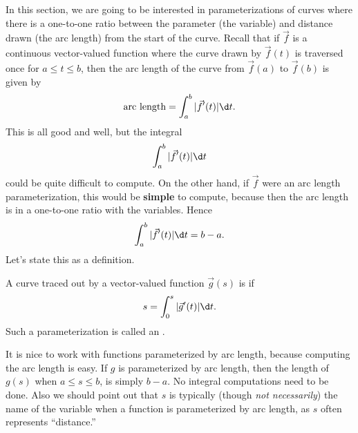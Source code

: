 \documentclass{ximera}
\begin{document}
In this section, we are going to be interested in parameterizations of
curves where there is a one-to-one ratio between the parameter (the
variable) and distance drawn (the arc length) from the start of the
curve.  Recall that if $\vec{f}$ is a continuous vector-valued
function where the curve drawn by $\vec{f}(t)$ is traversed once for
$a\le t\le b$, then the arc length of the curve from $\vec{f}(a)$ to
$\vec{f}(b)$ is given by
\[
\text{arc length} = \int_a^b |\vec{f}'(t)|\d t.
\]
This is all good and well, but the integral
\[
\int_a^b |\vec{f}'(t)|\d t
\]
could be quite difficult to compute. On the other hand, if $\vec{f}$
were an arc length parameterization, this would be \textbf{simple} to
compute, because then the arc length is in a one-to-one ratio with the
variables. Hence
\[
\int_a^b |\vec{f}'(t)|\d t = b-a.
\]
Let's state this as a definition.

\begin{definition}
  A curve traced out by a vector-valued function $\vec{g}(s)$ is  if
  \[
  s = \int_0^s |\vec{g}'(t)|\d t.
  \]
  Such a parameterization is called an .
\end{definition}
It is nice to work with functions parameterized by arc length, because
computing the arc length is easy. If $g$ is parameterized by arc
length, then the length of $g(s)$ when $a\le s\le b$, is simply
$b-a$. No integral computations need to be done. Also we should point
out that $s$ is typically (though \textit{not necessarily}) the name
of the variable when a function is parameterized by arc length, as $s$
often represents ``distance.''
\end{document}
